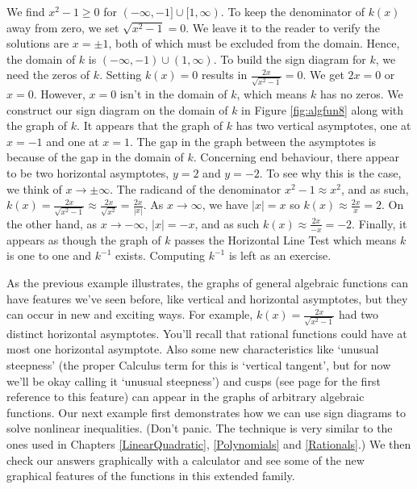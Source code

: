 {\begin{enumerate}
We find $x^2 - 1 \geq 0$ for $(-\infty, -1] \cup [1, \infty)$.  To keep the denominator of $k(x)$ away from zero, we set $\sqrt{x^2-1} = 0$. We leave it to the reader to verify the solutions are $x = \pm 1$, both of which must be excluded from the domain.    Hence, the domain of $k$ is $(-\infty, -1) \cup (1,\infty)$.  To build the sign diagram for $k$, we need the zeros of $k$.  Setting $k(x) = 0$ results in $\frac{2x}{\sqrt{x^2 - 1}}= 0$.  We get $2x =0$ or $x=0$.  However, $x=0$ isn't in the domain of $k$, which means $k$ has no zeros.  We construct our sign diagram on the domain of $k$ in Figure \ref{fig:algfun8} along with the graph of $k$. It appears that the graph of $k$ has two vertical asymptotes, one at $x=-1$ and one at $x=1$.   The gap in the graph between the asymptotes is because of the gap in the domain of $k$. Concerning end behaviour, there appear to be two horizontal asymptotes, $y = 2$ and $y=-2$.  To see why this is the case, we think of $x\rightarrow \pm \infty$.   The radicand of the denominator $x^2 - 1 \approx x^2$, and as such, $k(x) = \frac{2x}{\sqrt{x^2 - 1}} \approx \frac{2x}{\sqrt{x^2}} = \frac{2x}{|x|}$.  As $x \rightarrow \infty$, we have $|x| = x$ so $k(x) \approx \frac{2x}{x} = 2$.  On the other hand, as $x \rightarrow -\infty$, $|x| = -x$, and as such $k(x) \approx \frac{2x}{-x} = -2$. Finally, it appears as though the graph of $k$ passes the Horizontal Line Test which means $k$ is one to one and $k^{-1}$ exists.  Computing $k^{-1}$ is left as an exercise.

\end{enumerate}
}

\medskip

As the previous example illustrates, the graphs of general algebraic functions can have features we've seen before, like vertical and horizontal asymptotes, but they can occur in new and exciting ways. For example, $k(x) = \frac{2x}{\sqrt{x^{2} - 1}}$ had two distinct horizontal asymptotes.  You'll recall that rational functions could have at most one horizontal asymptote.  Also some new characteristics like `unusual steepness' (the proper Calculus term for this is `vertical tangent', but for now we'll be okay calling it `unusual steepness') and cusps (see page \pageref{cusppicture} for the first reference to this feature) can appear in the graphs of arbitrary algebraic functions.   Our next example first demonstrates how we can use sign diagrams to solve nonlinear inequalities. (Don't panic.  The technique is very similar to the ones used in Chapters \ref{LinearQuadratic}, \ref{Polynomials} and \ref{Rationals}.)  We then check our answers graphically with a calculator and see some of the new graphical features of the functions in this extended family.

